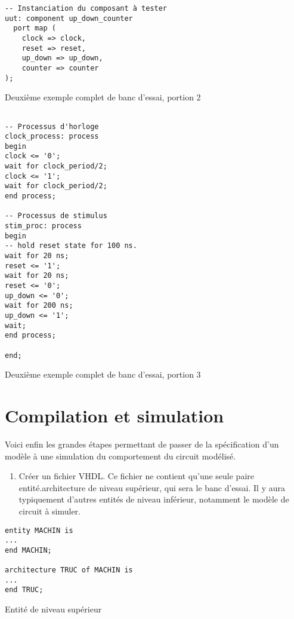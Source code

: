\documentclass[letter, oneside]{book}
\begin{document}
\begin{enumerate}
\begin{listing}[htbp]
\begin{verbatim}
-- Instanciation du composant à tester
uut: component up_down_counter
  port map (
    clock => clock,
    reset => reset,
    up_down => up_down,
    counter => counter
);

\end{verbatim}
\caption{Deuxième exemple complet de banc d'essai, portion 2}
\end{listing}

\begin{listing}[htbp]
\begin{verbatim}

-- Processus d'horloge
clock_process: process
begin
clock <= '0';
wait for clock_period/2;
clock <= '1';
wait for clock_period/2;
end process;

-- Processus de stimulus
stim_proc: process
begin
-- hold reset state for 100 ns.
wait for 20 ns;
reset <= '1';
wait for 20 ns;
reset <= '0';
up_down <= '0';
wait for 200 ns;
up_down <= '1';
wait;
end process;

end;
\end{verbatim}
\caption{Deuxième exemple complet de banc d'essai, portion 3}
\end{listing}
\end{enumerate}


\section{Compilation et simulation}
\label{sec:org55fc4c9}

Voici enfin les grandes étapes permettant de passer de la spécification d'un
modèle à une simulation du comportement du circuit modélisé. 

\begin{enumerate}
\item Créer un fichier VHDL. Ce fichier ne contient qu'une seule paire
entité.architecture de niveau supérieur, qui sera le banc
d'essai. Il y aura typiquement d'autres entités de niveau
inférieur, notamment le modèle de circuit à simuler.
\end{enumerate}

\begin{listing}[htbp]
\begin{verbatim}
entity MACHIN is
...
end MACHIN;

architecture TRUC of MACHIN is
...
end TRUC;
\end{verbatim}
\caption{Entité de niveau supérieur}
\end{listing}
\end{document}
